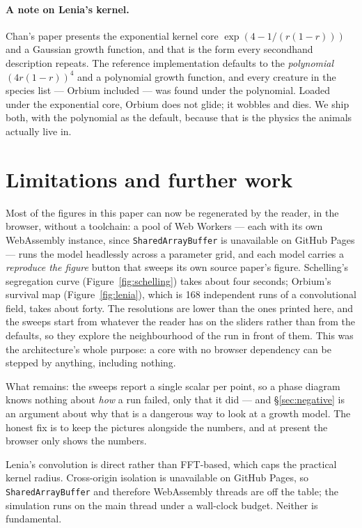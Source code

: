 \documentclass[11pt,a4paper]{article}
\begin{document}
\paragraph{A note on Lenia's kernel.}
Chan's paper presents the exponential kernel core $\exp(4 - 1/(r(1-r)))$ and a
Gaussian growth function, and that is the form every secondhand description
repeats. The reference implementation defaults to the \emph{polynomial}
$(4r(1-r))^4$ and a polynomial growth function, and every creature in the species
list --- Orbium included --- was found under the polynomial. Loaded under the
exponential core, Orbium does not glide; it wobbles and dies. We ship both, with
the polynomial as the default, because that is the physics the animals actually
live in.

\section{Limitations and further work}

Most of the figures in this paper can now be regenerated by the reader, in the
browser, without a toolchain: a pool of Web Workers --- each with its own
WebAssembly instance, since \texttt{SharedArrayBuffer} is unavailable on GitHub
Pages --- runs the model headlessly across a parameter grid, and each model
carries a \emph{reproduce the figure} button that sweeps its own source paper's
figure. Schelling's segregation curve (Figure~\ref{fig:schelling}) takes about
four seconds; Orbium's survival map (Figure~\ref{fig:lenia}), which is 168
independent runs of a convolutional field, takes about forty. The resolutions are
lower than the ones printed here, and the sweeps start from whatever the reader
has on the sliders rather than from the defaults, so they explore the
neighbourhood of the run in front of them. This was the architecture's whole
purpose: a core with no browser dependency can be stepped by anything, including
nothing.

What remains: the sweeps report a single scalar per point, so a phase diagram
knows nothing about \emph{how} a run failed, only that it did --- and
\S\ref{sec:negative} is an argument about why that is a dangerous way to look at
a growth model. The honest fix is to keep the pictures alongside the numbers, and
at present the browser only shows the numbers.

Lenia's convolution is direct rather than FFT-based, which caps the practical
kernel radius. Cross-origin isolation is unavailable on GitHub Pages, so
\texttt{SharedArrayBuffer} and therefore WebAssembly threads are off the table;
the simulation runs on the main thread under a wall-clock budget. Neither is
fundamental.
\end{document}
